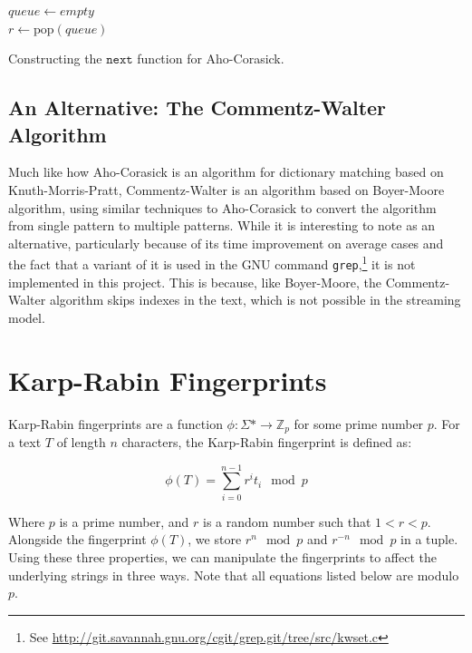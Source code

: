 \documentclass[ %
                    author={Dominic Joseph Moylett},
                    degree={MEng},
                     title={Dictionary Matching with Fingerprints},
                  subtitle={An Empirical Analysis},
                      type={Research},
                      year={2014} ]{dissertation}
\begin{document}
\begin{algorithm}[t]
$queue \gets empty$\\
 {
  $r \gets \text{pop}(queue)$\\
}
\caption{Constructing the $\texttt{next}$ function for Aho-Corasick.}
\label{alg:ac-next}
\end{algorithm}

\subsection{An Alternative: The Commentz-Walter Algorithm}

Much like how Aho-Corasick is an algorithm for dictionary matching based on Knuth-Morris-Pratt, Commentz-Walter\cite{commentz-walter:algo} is an algorithm based on Boyer-Moore algorithm\cite{Boyer:1977:FSS:359842.359859}, using similar techniques to Aho-Corasick to convert the algorithm from single pattern to multiple patterns. While it is interesting to note as an alternative, particularly because of its time improvement on average cases and the fact that a variant of it is used in the GNU command \texttt{grep},\footnote{See \url{http://git.savannah.gnu.org/cgit/grep.git/tree/src/kwset.c}} it is not implemented in this project. This is because, like Boyer-Moore, the Commentz-Walter algorithm skips indexes in the text, which is not possible in the streaming model.

\section{Karp-Rabin Fingerprints}
\label{sec:kr-fingerprints}

Karp-Rabin fingerprints\cite{5390135} are a function $\phi : \Sigma* \to \mathbb{Z}_p$ for some prime number $p$. For a text $T$ of length $n$ characters, the Karp-Rabin fingerprint is defined as:

$$\phi(T) = \sum_{i = 0}^{n - 1} r^it_i \mod p$$

Where $p$ is a prime number, and $r$ is a random number such that $1 < r < p$. Alongside the fingerprint $\phi(T)$, we store $r^n \mod p$ and $r^{-n} \mod p$ in a tuple. Using these three properties, we can manipulate the fingerprints to affect the underlying strings in three ways\cite{5438620}. Note that all equations listed below are modulo $p$.
\end{document}
